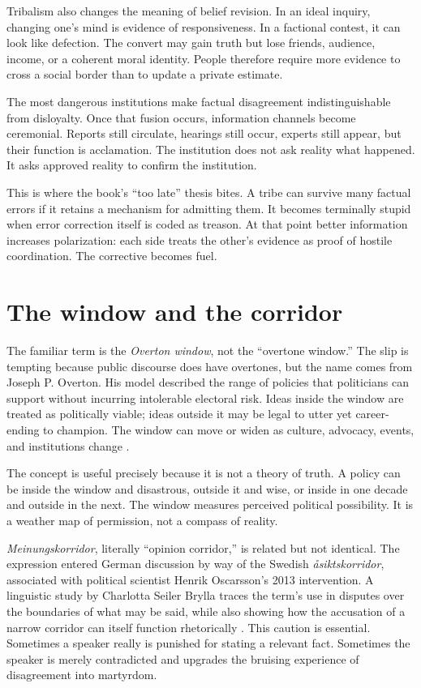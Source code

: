 ﻿\documentclass[12pt,a4paper]{book}
\begin{document}
Tribalism also changes the meaning of belief revision. In an ideal inquiry, changing one's mind is evidence of responsiveness. In a factional contest, it can look like defection. The convert may gain truth but lose friends, audience, income, or a coherent moral identity. People therefore require more evidence to cross a social border than to update a private estimate.

The most dangerous institutions make factual disagreement indistinguishable from disloyalty. Once that fusion occurs, information channels become ceremonial. Reports still circulate, hearings still occur, experts still appear, but their function is acclamation. The institution does not ask reality what happened. It asks approved reality to confirm the institution.

This is where the book's “too late” thesis bites. A tribe can survive many factual errors if it retains a mechanism for admitting them. It becomes terminally stupid when error correction itself is coded as treason. At that point better information increases polarization: each side treats the other's evidence as proof of hostile coordination. The corrective becomes fuel.

\section{The window and the corridor}

The familiar term is the \emph{Overton window}, not the “overtone window.” The slip is tempting because public discourse does have overtones, but the name comes from Joseph P. Overton. His model described the range of policies that politicians can support without incurring intolerable electoral risk. Ideas inside the window are treated as politically viable; ideas outside it may be legal to utter yet career-ending to champion. The window can move or widen as culture, advocacy, events, and institutions change \cite{MackinacOvertonWindow}.

The concept is useful precisely because it is not a theory of truth. A policy can be inside the window and disastrous, outside it and wise, or inside in one decade and outside in the next. The window measures perceived political possibility. It is a weather map of permission, not a compass of reality.

\emph{Meinungskorridor}, literally “opinion corridor,” is related but not identical. The expression entered German discussion by way of the Swedish \emph{åsiktskorridor}, associated with political scientist Henrik Oscarsson's 2013 intervention. A linguistic study by Charlotta Seiler Brylla traces the term's use in disputes over the boundaries of what may be said, while also showing how the accusation of a narrow corridor can itself function rhetorically \cite{SeilerBrylla2019}. This caution is essential. Sometimes a speaker really is punished for stating a relevant fact. Sometimes the speaker is merely contradicted and upgrades the bruising experience of disagreement into martyrdom.
\end{document}
